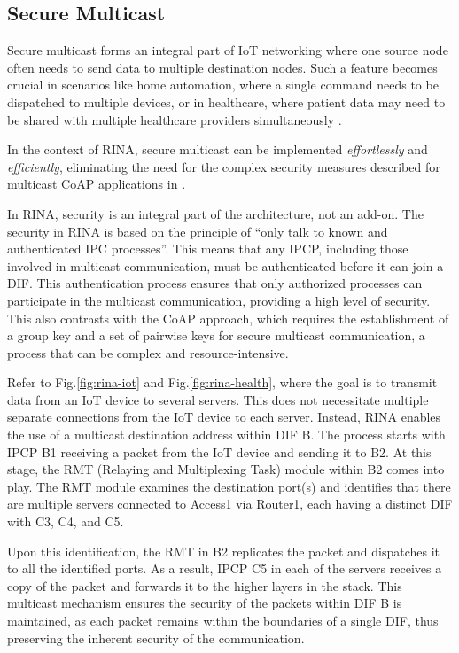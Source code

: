 \documentclass{ieeeaccess}
\begin{document}
\subsection{Secure Multicast}

Secure multicast forms an integral part of IoT networking where one source node often needs to send data to multiple destination nodes. Such a feature becomes crucial in scenarios like home automation, where a single command needs to be dispatched to multiple devices, or in healthcare, where patient data may need to be shared with multiple healthcare providers simultaneously \cite{park2020security}.

In the context of RINA, secure multicast can be implemented \textit{effortlessly} and \textit{efficiently}, eliminating the need for the complex security measures described for multicast CoAP applications in \cite{park2020security}.

In RINA, security is an integral part of the architecture, not an add-on. The security in RINA is based on the principle of ``only talk to known and authenticated IPC processes''. This means that any IPCP, including those involved in multicast communication, must be authenticated before it can join a DIF. This authentication process ensures that only authorized processes can participate in the multicast communication, providing a high level of security. This also contrasts with the CoAP approach, which requires the establishment of a group key and a set of pairwise keys for secure multicast communication, a process that can be complex and resource-intensive.

Refer to Fig.\ref{fig:rina-iot} and Fig.\ref{fig:rina-health}, where the goal is to transmit data from an IoT device to several servers. This does not necessitate multiple separate connections from the IoT device to each server. Instead, RINA enables the use of a multicast destination address within DIF B. The process starts with IPCP B1 receiving a packet from the IoT device and sending it to B2. At this stage, the RMT (Relaying and Multiplexing Task) module within B2 comes into play. The RMT module examines the destination port(s) and identifies that there are multiple servers connected to Access1 via Router1, each having a distinct DIF with C3, C4, and C5.

Upon this identification, the RMT in B2 replicates the packet and dispatches it to all the identified ports. As a result, IPCP C5 in each of the servers receives a copy of the packet and forwards it to the higher layers in the stack. This multicast mechanism ensures the security of the packets within DIF B is maintained, as each packet remains within the boundaries of a single DIF, thus preserving the inherent security of the communication.
\end{document}
